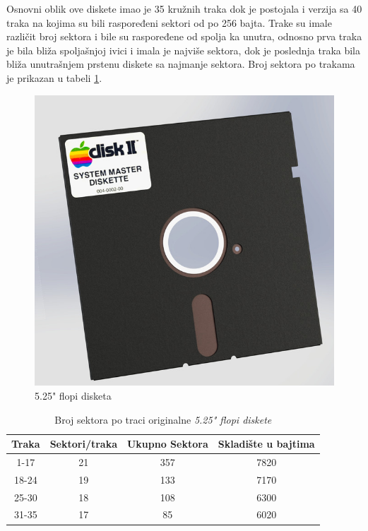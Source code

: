 Osnovni oblik ove diskete imao je 35 kružnih traka dok je postojala i verzija sa 40 traka na kojima su bili raspoređeni sektori od po 256 bajta. Trake su imale različit broj sektora i bile su raspoređene od spolja ka unutra, odnosno prva traka je bila bliža spoljašnjoj ivici i imala je najviše sektora, dok je poslednja traka bila bliža unutrašnjem prstenu diskete sa najmanje sektora. Broj sektora po trakama je prikazan u tabeli \ref{tab:sektor_traka}.

\begin{figure}[ht]
\begin{center}
\includegraphics[width=\textwidth]{img/Flopi.jpg}
\caption[5.25" flopi disketa \textit{(preuzeto \cite{Flopi})}]{5.25" flopi disketa}
\label{img:flopi}
\end{center}
\end{figure}

\begin{table}[h!]
\begin{center}
\begin{tabular}{ | c | c| c | c | } 
\hline
Traka & Sektori/traka & Ukupno Sektora & Skladište u bajtima \\
\hline
\hline
1-17 & 21 & 357 & 7820 \\
\hline
18-24 & 19 & 133 & 7170 \\
\hline
25-30 & 18 & 108 & 6300 \\
\hline
31-35 & 17 & 85 & 6020 \\
\hline
\end{tabular}
\end{center}
\caption{Broj sektora po traci originalne \textit{5.25" flopi diskete}}
\label{tab:sektor_traka}
\end{table}

